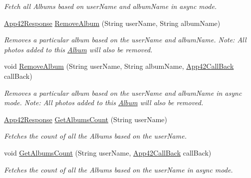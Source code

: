 \begin{DoxyCompactItemize}
\begin{DoxyCompactList}\small\item\em Fetch all Albums based on user\+Name and album\+Name in async mode. \end{DoxyCompactList}\item 
\hyperlink{classcom_1_1shephertz_1_1app42_1_1paas_1_1sdk_1_1csharp_1_1_app42_response}{App42\+Response} \hyperlink{classcom_1_1shephertz_1_1app42_1_1paas_1_1sdk_1_1csharp_1_1gallery_1_1_album_service_a7f908f2b726f933f0ea1e54af1c2193c}{Remove\+Album} (String user\+Name, String album\+Name)
\begin{DoxyCompactList}\small\item\em Removes a particular album based on the user\+Name and album\+Name. Note\+: All photos added to this \hyperlink{classcom_1_1shephertz_1_1app42_1_1paas_1_1sdk_1_1csharp_1_1gallery_1_1_album}{Album} will also be removed. \end{DoxyCompactList}\item 
void \hyperlink{classcom_1_1shephertz_1_1app42_1_1paas_1_1sdk_1_1csharp_1_1gallery_1_1_album_service_af29a2ebcf8ea0ac5d81d8c8a68a4b78d}{Remove\+Album} (String user\+Name, String album\+Name, \hyperlink{interfacecom_1_1shephertz_1_1app42_1_1paas_1_1sdk_1_1csharp_1_1_app42_call_back}{App42\+Call\+Back} call\+Back)
\begin{DoxyCompactList}\small\item\em Removes a particular album based on the user\+Name and album\+Name in async mode. Note\+: All photos added to this \hyperlink{classcom_1_1shephertz_1_1app42_1_1paas_1_1sdk_1_1csharp_1_1gallery_1_1_album}{Album} will also be removed. \end{DoxyCompactList}\item 
\hyperlink{classcom_1_1shephertz_1_1app42_1_1paas_1_1sdk_1_1csharp_1_1_app42_response}{App42\+Response} \hyperlink{classcom_1_1shephertz_1_1app42_1_1paas_1_1sdk_1_1csharp_1_1gallery_1_1_album_service_aca747635b5c6568d1d9d0aa3af5bdd7c}{Get\+Albums\+Count} (String user\+Name)
\begin{DoxyCompactList}\small\item\em Fetches the count of all the Albums based on the user\+Name. \end{DoxyCompactList}\item 
void \hyperlink{classcom_1_1shephertz_1_1app42_1_1paas_1_1sdk_1_1csharp_1_1gallery_1_1_album_service_af8bffd98fdc4438308573ebc401066d9}{Get\+Albums\+Count} (String user\+Name, \hyperlink{interfacecom_1_1shephertz_1_1app42_1_1paas_1_1sdk_1_1csharp_1_1_app42_call_back}{App42\+Call\+Back} call\+Back)
\begin{DoxyCompactList}\small\item\em Fetches the count of all the Albums based on the user\+Name in async mode. \end{DoxyCompactList}\end{DoxyCompactItemize}
